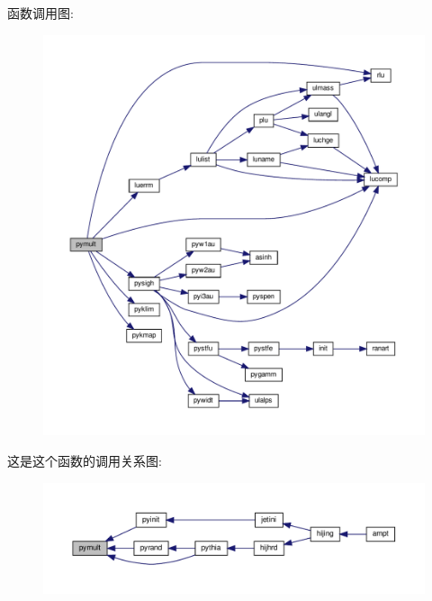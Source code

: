 函数调用图\+:
\nopagebreak
\begin{figure}[H]
\begin{center}
\leavevmode
\includegraphics[width=350pt]{pymult_8f90_a20d9f35a0a873dc804bd38ec6a9e95eb_cgraph}
\end{center}
\end{figure}
这是这个函数的调用关系图\+:
\nopagebreak
\begin{figure}[H]
\begin{center}
\leavevmode
\includegraphics[width=350pt]{pymult_8f90_a20d9f35a0a873dc804bd38ec6a9e95eb_icgraph}
\end{center}
\end{figure}
